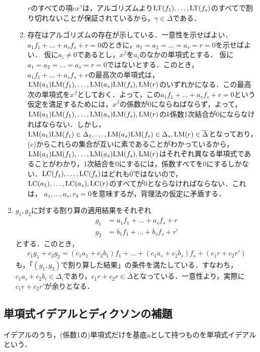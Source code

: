\documentclass[9pt]{ltjsarticle}
\begin{document}
\begin{enumerate}[label=(問題\arabic*)]
\begin{enumerate}[label=(\alph*)]
$r$のすべての項$cx^\gamma$は，アルゴリズムより${\rm LT}(f_1),\dots,{\rm LT}(f_s)$のすべてで割り切れないことが保証されているから，$\gamma \in \overline \Delta$である．
 \item
存在はアルゴリズムの存在が示している．一意性を示せばよい．$a_1 f_1 + \dots + a_s f_s +r = 0$のときに，$a_1=a_2=\dots=a_s = r=0$を示せばよい．
仮に$a_i\neq 0$であるとし，$x^\beta$を$a_i$のなかの単項式とする．
仮に$a_1=a_2=\dots=a_s=r=0$ではないとする．このとき，$a_1f_1 + \dots + a_s f_s +r$の最高次の単項式は，${\rm LM}(a_1){\rm LM}(f_1),\dots,{\rm LM}(a_s){\rm LM}(f_s),{\rm LM}(r)$のいずれかになる．この最高次の単項式を$x^\beta$としておく．よって，この$a_1f_1 + \dots + a_s f_s + r=0$という仮定を満足するためには，$x^\beta$の係数が0にならねばならず，よって，${\rm LM}(a_1){\rm LM}(f_1),\dots,{\rm LM}(a_s){\rm LM}(f_s),{\rm LM}(r)$の$k$係数1次結合が0にならなければならない．しかし，${\rm LM}(a_1){\rm LM}(f_1) \in \Delta_1,\dots,{\rm LM}(a_s){\rm LM}(f_s)\in \Delta_s,{\rm LM}(r)\in \overline\Delta$となっており，(c)からこれらの集合が互いに素であることがわかっているから，${\rm LM}(a_1){\rm LM}(f_1),\dots, {\rm LM}(a_s){\rm LM}(f_s),{\rm LM}(r)$はそれぞれ異なる単項式であることがわかり，1次結合を0にするには，係数すべてを0にするしかない．${\rm LC}(f_1),\dots,{\rm LC}(f_s)$はどれも0ではないので，
${\rm LC}(a_1),\dots,{\rm LC}(a_s),{\rm LC}(r)$のすべてが0とならなければならない．これは，
$a_1,\dots,a_s,r_0=0$を意味するが，背理法の仮定に矛盾する．
\end{enumerate}
 \item $g_1,g_2$に対する割り算の適用結果をそれぞれ
\begin{align}
 g_1 &= a_1 f_1 + \dots + a_s f_s + r\\
 g_2 & = b_1 f_1 + \dots + b_s f_s + r'
\end{align}
とする．このとき，
\begin{align}
 c_1 g_1 + c_2 g_2 = (c_1 a_1 + c_2 b_1)f_1 + \dots + (c_1 a_s + c_2 b_s)f_s + (c_1 r+c_2 r')
\end{align}
も，「$(g_1,g_2)$で割り算した結果」の条件を満たしている．すなわち，
$c_1 a_i+c_2 b_i \in \Delta_i$であり，$c_1 r+c_2 r\in \overline \Delta$となっている．一意性より，実際に$c_1 r+ c_2 r'$が余りとなる．
\end{enumerate}

\subsection{単項式イデアルとディクソンの補題}
イデアルのうち，(係数1の)単項式だけを基底aとして持つものを単項式イデアルという．
\end{document}
